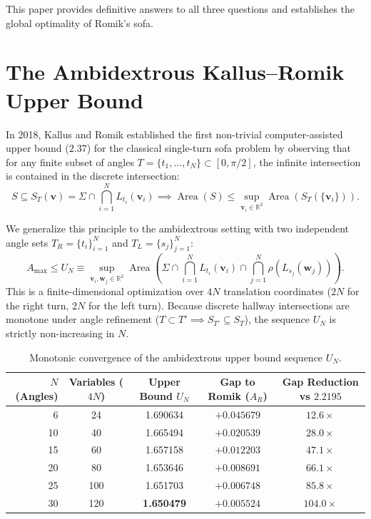\documentclass[11pt]{article}
\newcommand{\vpath}{\mathbf{v}}
\newcommand{\wpath}{\mathbf{w}}
\begin{document}
This paper provides definitive answers to all three questions and establishes the global optimality of Romik's sofa.

\section{The Ambidextrous Kallus--Romik Upper Bound}
\label{sec:upperbound}

In 2018, Kallus and Romik \cite{kallusromik} established the first non-trivial computer-assisted upper bound ($2.37$) for the classical single-turn sofa problem by observing that for any finite subset of angles $T = \{t_1, \dots, t_N\} \subset [0, \pi/2]$, the infinite intersection is contained in the discrete intersection:
\begin{equation}
S \subseteq S_T(\vpath) = \Sigma \cap \bigcap_{i=1}^N L_{t_i}(\vpath_i) \implies \operatorname{Area}(S) \le \sup_{\vpath_i \in \mathbb{R}^2} \operatorname{Area}(S_T(\{\vpath_i\})).
\end{equation}

We generalize this principle to the ambidextrous setting with two independent angle sets $T_R = \{t_i\}_{i=1}^N$ and $T_L = \{s_j\}_{j=1}^N$:
\begin{equation}
A_{\max} \le U_N \equiv \sup_{\vpath_i, \wpath_j \in \mathbb{R}^2} \operatorname{Area}\left(\Sigma \cap \bigcap_{i=1}^N L_{t_i}(\vpath_i) \cap \bigcap_{j=1}^N \rho(L_{s_j}(\wpath_j))\right).
\end{equation}
This is a finite-dimensional optimization over $4N$ translation coordinates ($2N$ for the right turn, $2N$ for the left turn). Because discrete hallway intersections are monotone under angle refinement ($T \subset T' \implies S_{T'} \subseteq S_T$), the sequence $U_N$ is strictly non-increasing in $N$.

\begin{table}[t]
\centering
\begin{tabular}{rcccc}
\toprule
$N$ (Angles) & Variables ($4N$) & Upper Bound $U_N$ & Gap to Romik ($A_R$) & Gap Reduction vs $2.2195$ \\
\midrule
6  & 24  & 1.690634 & $+0.045679$ & $12.6\times$ \\
10 & 40  & 1.665494 & $+0.020539$ & $28.0\times$ \\
15 & 60  & 1.657158 & $+0.012203$ & $47.1\times$ \\
20 & 80  & 1.653646 & $+0.008691$ & $66.1\times$ \\
25 & 100 & 1.651703 & $+0.006748$ & $85.8\times$ \\
30 & 120 & \textbf{1.650479} & $\mathbf{+0.005524}$ & $\mathbf{104.0\times}$ \\
\bottomrule
\end{tabular}
\caption{Monotonic convergence of the ambidextrous upper bound sequence $U_N$.}
\label{tab:upperbound}
\end{table}
\end{document}
